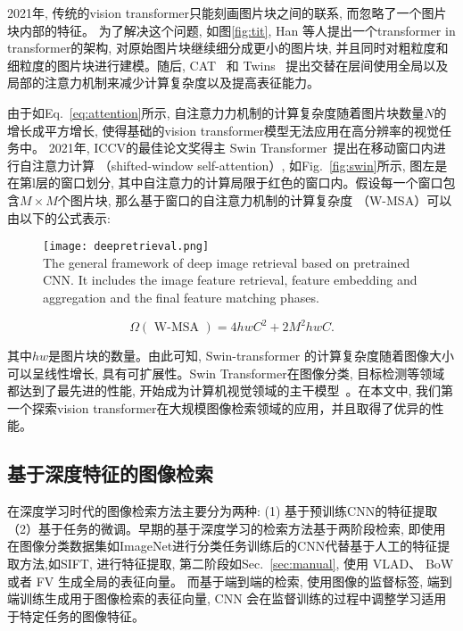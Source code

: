 2021年, 传统的vision transformer只能刻画图片块之间的联系, 而忽略了一个图片块内部的特征。 为了解决这个问题, 如图\ref{fig:tit}, Han 等人提出一个transformer in transformer的架构, 对原始图片块继续细分成更小的图片块, 并且同时对粗粒度和细粒度的图片块进行建模。随后, CAT~\cite{lin2022cat} 和 Twins~\cite{chu2021twins} 提出交替在层间使用全局以及局部的注意力机制来减少计算复杂度以及提高表征能力。\par

由于如Eq.~\ref{eq:attention}所示, 自注意力力机制的计算复杂度随着图片块数量$N$的增长成平方增长, 使得基础的vision transformer模型无法应用在高分辨率的视觉任务中。 2021年, ICCV的最佳论文奖得主 Swin Transformer~\cite{liu2021swin}提出在移动窗口内进行自注意力计算 （shifted-window self-attention）, 如Fig.~\ref{fig:swin}所示, 图左是在第l层的窗口划分, 其中自注意力的计算局限于红色的窗口内。假设每一个窗口包含$M \times M$个图片块, 那么基于窗口的自注意力机制的计算复杂度 （W-MSA）可以由以下的公式表示:

\begin{figure}[!htp]
    \centering
    \texttt{[image: deepretrieval.png]} \\
      {The general framework of deep image retrieval based on pretrained CNN. It includes the image feature retrieval, feature embedding and aggregation and the final feature matching phases. }
   \label{fig:retrieval}
\end{figure}

\begin{equation}
    \Omega(\text { W-MSA })=4 h w C^2+2 M^2 hwC.
\end{equation}

其中$hw$是图片块的数量。由此可知, Swin-transformer 的计算复杂度随着图像大小可以呈线性增长, 具有可扩展性。Swin Transformer在图像分类, 目标检测等领域都达到了最先进的性能, 开始成为计算机视觉领域的主干模型~\cite{liu2021swinnet,liu2022video, huang2022swin, cao2021swin, ma2022swinfusion}。在本文中, 我们第一个探索vision transformer在大规模图像检索领域的应用，并且取得了优异的性能。

\subsection{基于深度特征的图像检索}
在深度学习时代的图像检索方法主要分为两种: (1) 基于预训练CNN的特征提取 （2）基于任务的微调。早期的基于深度学习的检索方法基于两阶段检索, 即使用在图像分类数据集如ImageNet进行分类任务训练后的CNN代替基于人工的特征提取方法,如SIFT, 进行特征提取, 第二阶段如Sec.~\ref{sec:manual}, 使用 VLAD、 BoW 或者 FV 生成全局的表征向量。 而基于端到端的检索, 使用图像的监督标签, 端到端训练生成用于图像检索的表征向量, CNN 会在监督训练的过程中调整学习适用于特定任务的图像特征。

